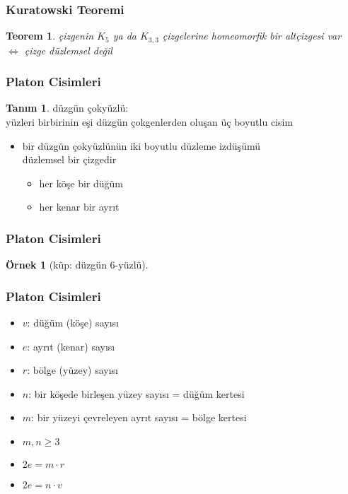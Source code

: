 \documentclass[dvipsnames]{beamer}
\theoremstyle{definition}
\newtheorem{tanim}[theorem]{Tanım}
\theoremstyle{example}
\newtheorem{ornek}[theorem]{Örnek}
\theoremstyle{plain}
\newtheorem{teorem}[theorem]{Teorem}
\begin{document}
\begin{frame}
  \frametitle{Kuratowski Teoremi}

  \begin{teorem}
    çizgenin $K_5$ ya da $K_{3,3}$ çizgelerine homeomorfik bir altçizgesi var\\
    $\Leftrightarrow$ çizge düzlemsel değil
  \end{teorem}
\end{frame}

\begin{frame}
  \frametitle{Platon Cisimleri}

  \begin{tanim}
    \alert{düzgün çokyüzlü}:\\
    yüzleri birbirinin eşi düzgün çokgenlerden oluşan üç boyutlu cisim
  \end{tanim}

  \pause
  \begin{itemize}
    \item bir düzgün çokyüzlünün iki boyutlu düzleme izdüşümü\\
      düzlemsel bir çizgedir
    \begin{itemize}
      \item her köşe bir düğüm
      \item her kenar bir ayrıt
    \end{itemize}
  \end{itemize}
\end{frame}

\begin{frame}
  \frametitle{Platon Cisimleri}

  \begin{ornek}[küp: düzgün 6-yüzlü]
    \begin{center}
    \end{center}
  \end{ornek}
\end{frame}

\begin{frame}
  \frametitle{Platon Cisimleri}

  \begin{itemize}
    \item $v$: düğüm (köşe) sayısı
    \item $e$: ayrıt (kenar) sayısı
    \item $r$: bölge (yüzey) sayısı
    \item $n$: bir köşede birleşen yüzey sayısı = düğüm kertesi
    \item $m$: bir yüzeyi çevreleyen ayrıt sayısı = bölge kertesi
  \end{itemize}

  \pause
  \begin{itemize}
    \item $m,n \geq 3$
    \item $2e = m \cdot r$
    \item $2e = n \cdot v$
  \end{itemize}
\end{frame}
\end{document}
